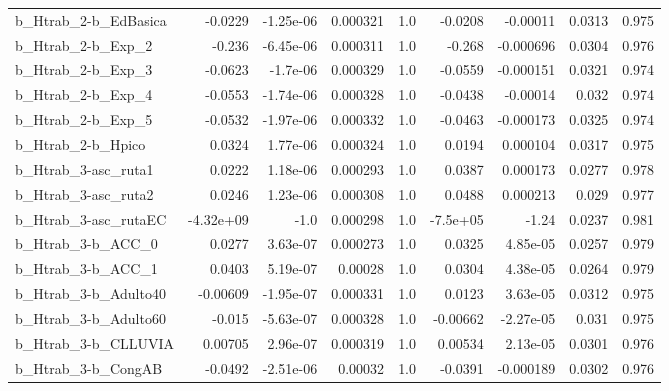 \begin{tabular}{lrrrrrrrr}
b\_Htrab\_2-b\_EdBasica       &     -0.0229 &    -1.25e-06 &  0.000321 &      1.0 &    -0.0208 &    -0.00011 &       0.0313 &         0.975 \\
b\_Htrab\_2-b\_Exp\_2          &      -0.236 &    -6.45e-06 &  0.000311 &      1.0 &     -0.268 &   -0.000696 &       0.0304 &         0.976 \\
b\_Htrab\_2-b\_Exp\_3          &     -0.0623 &     -1.7e-06 &  0.000329 &      1.0 &    -0.0559 &   -0.000151 &       0.0321 &         0.974 \\
b\_Htrab\_2-b\_Exp\_4          &     -0.0553 &    -1.74e-06 &  0.000328 &      1.0 &    -0.0438 &    -0.00014 &        0.032 &         0.974 \\
b\_Htrab\_2-b\_Exp\_5          &     -0.0532 &    -1.97e-06 &  0.000332 &      1.0 &    -0.0463 &   -0.000173 &       0.0325 &         0.974 \\
b\_Htrab\_2-b\_Hpico          &      0.0324 &     1.77e-06 &  0.000324 &      1.0 &     0.0194 &    0.000104 &       0.0317 &         0.975 \\
b\_Htrab\_3-asc\_ruta1        &      0.0222 &     1.18e-06 &  0.000293 &      1.0 &     0.0387 &    0.000173 &       0.0277 &         0.978 \\
b\_Htrab\_3-asc\_ruta2        &      0.0246 &     1.23e-06 &  0.000308 &      1.0 &     0.0488 &    0.000213 &        0.029 &         0.977 \\
b\_Htrab\_3-asc\_rutaEC       &   -4.32e+09 &         -1.0 &  0.000298 &      1.0 &   -7.5e+05 &       -1.24 &       0.0237 &         0.981 \\
b\_Htrab\_3-b\_ACC\_0          &      0.0277 &     3.63e-07 &  0.000273 &      1.0 &     0.0325 &    4.85e-05 &       0.0257 &         0.979 \\
b\_Htrab\_3-b\_ACC\_1          &      0.0403 &     5.19e-07 &   0.00028 &      1.0 &     0.0304 &    4.38e-05 &       0.0264 &         0.979 \\
b\_Htrab\_3-b\_Adulto40       &    -0.00609 &    -1.95e-07 &  0.000331 &      1.0 &     0.0123 &    3.63e-05 &       0.0312 &         0.975 \\
b\_Htrab\_3-b\_Adulto60       &      -0.015 &    -5.63e-07 &  0.000328 &      1.0 &   -0.00662 &   -2.27e-05 &        0.031 &         0.975 \\
b\_Htrab\_3-b\_CLLUVIA        &     0.00705 &     2.96e-07 &  0.000319 &      1.0 &    0.00534 &    2.13e-05 &       0.0301 &         0.976 \\
b\_Htrab\_3-b\_CongAB         &     -0.0492 &    -2.51e-06 &   0.00032 &      1.0 &    -0.0391 &   -0.000189 &       0.0302 &         0.976 \\

\end{tabular}

